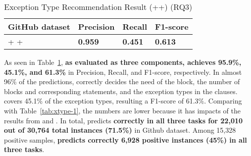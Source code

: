 \begin{table}[t]%
  \caption{Exception Type Recommendation Result (\xblock+\xstate+\xtype) (RQ3)}
  \vspace{-12pt}
  \small
	\begin{center}
		\renewcommand{\arraystretch}{1}
		\begin{tabular}{| p{3.10cm}<{\centering} | p{1.2cm}<{\centering} | p{1.2cm}<{\centering}| p{1.2cm}<{\centering}|}
		  \hline
			GitHub dataset  & Precision  & Recall & F1-score \\
			\hline
			\xblock + \xstate  + \xtype  & {\bf 0.959}  &  {\bf 0.451} & {\bf 0.613}\\
			\hline
		\end{tabular}
		\label{tab:xtype-4}
	\end{center}
\end{table}

As seen in Table~\ref{tab:xtype-4}, {\bf {\tool} as evaluated as three
  components, achieves 95.9\%, 45.1\%, and 61.3\%} in Precision,
Recall, and F1-score, respectively. In almost 96\% of the predictions,
{\tool} correctly decides the need of the  block, the
number of blocks and corresponding statements, and the exception types
in the  clauses. {\tool} covers 45.1\% of the exception
types, resulting a F1-score of 61.3\%. Comparing with
Table~\ref{tab:xtype-1}, the numbers are lower because it has impacts
of the results from \xblock and \xstate. In total, {\tool} predicts
{\bf correctly in all three tasks for 22,010 out of 30,764 total
  instances (71.5\%)} in Github dataset. Among 15,328 positive
samples, {\bf {\tool} predicts correctly 6,928 positive instances
  (45\%) in all three tasks}.

